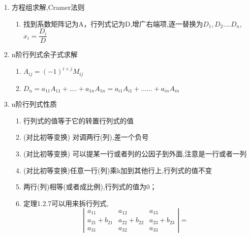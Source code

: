 \documentclass[11pt, a4paper, UTF8]{ctexart}
\begin{document}
\begin{solution}
  
  \begin{enumerate}
    \item 方程组求解,Cramer法则
    \begin{enumerate}
      \item 找到系数矩阵记为A，行列式记为D,增广右端项,逐一替换为$D_1,D_2....D_n$,$x_i=\dfrac{D_i}{D}$
    \end{enumerate}
    \item n阶行列式余子式求解
    \begin{enumerate}
      \item $A_{ij}=(-1)^{i+j}M_{ij}$
      \item $D_n=a_{11}A_{11}+....+a_{1n}A_{1n}=a_{i1}A_{i1}+......+a_{in}A_{in}$
    \end{enumerate}
    \item n阶行列式性质
    \begin{enumerate}
      \item 行列式的值等于它的转置行列式的值
      \item (对比初等变换) 对调两行(列),差一个负号
      \item (对比初等变换)  可以提某一行或者列的公因子到外面,注意是一行或者一列
      \item (对比初等变换)任意一行(列)乘k加到其他行上,行列式的值不变
      \item 两行(列)相等(或者成比例),行列式的值为0；
      \item 定理1.2.7可以用来拆行列式,
      $${ 
        \left|\begin{array}{cccc} 
            a_{11} &    a_{12}    & a_{13} \\ 
            a_{21}+b_{21} &    a_{22}+b_{22}   & a_{23}+b_{23}\\ 
            a_{31} &    a_{32}   & a_{33}
        \end{array}\right| 
        }={ 
}$$
\end{enumerate}
\end{enumerate}
\end{solution}
\end{document}
